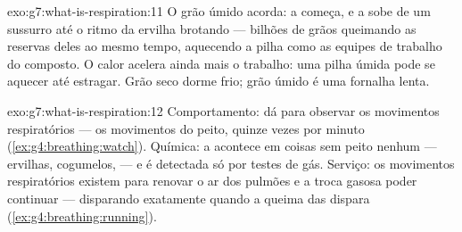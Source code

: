 \begin{solution}{exo:g7:what-is-respiration:11}
O grão úmido acorda: a  começa, e a  sobe de um
sussurro até o ritmo da ervilha brotando --- bilhões de grãos queimando
as reservas deles ao mesmo tempo, aquecendo a pilha como as equipes de
trabalho do composto. O calor acelera ainda mais o trabalho: uma pilha
úmida pode se aquecer até estragar. Grão seco dorme frio; grão úmido é
uma fornalha lenta.
\end{solution}

\begin{solution}{exo:g7:what-is-respiration:12}
Comportamento: dá para observar os movimentos respiratórios --- os
movimentos do peito, quinze vezes por minuto
(\cref{ex:g4:breathing:watch}). Química: a  acontece em
coisas sem peito nenhum --- ervilhas, cogumelos,  --- e é detectada
só por testes de gás. Serviço: os movimentos respiratórios existem
para renovar o ar dos pulmões e a troca gasosa poder continuar ---
disparando exatamente quando a queima das  dispara
(\cref{ex:g4:breathing:running}).
\end{solution}

